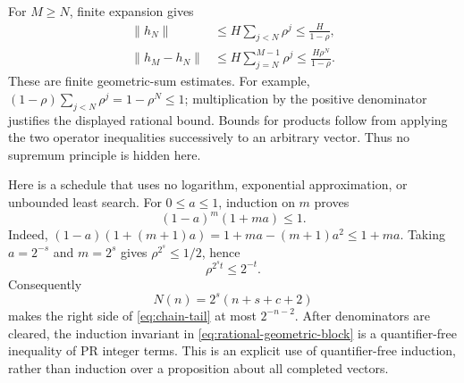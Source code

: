 For $M\ge N$, finite expansion gives
\begin{align}
 \|h_N\|&\le H\sum_{j<N}\rho^j
                  \le\frac{H}{1-\rho},\label{eq:chain-bound}\\
 \|h_M-h_N\|&\le H\sum_{j=N}^{M-1}\rho^j
                  \le\frac{H\rho^N}{1-\rho}.
                  \label{eq:chain-tail}
\end{align}
These are finite geometric-sum estimates.  For example,
$(1-\rho)\sum_{j<N}\rho^j=1-\rho^N\le1$; multiplication by the
positive denominator justifies the displayed rational bound.  Bounds for
products follow from applying the two operator inequalities successively
to an arbitrary vector.  Thus no supremum principle is hidden here.

Here is a schedule that uses no logarithm, exponential approximation,
or unbounded least search.  For $0\le a\le1$, induction on $m$ proves
\begin{equation}
                   (1-a)^m(1+ma)\le1.
 \label{eq:rational-geometric-block}
\end{equation}
Indeed,
$(1-a)(1+(m+1)a)=1+ma-(m+1)a^2\le1+ma$.
Taking $a=2^{-s}$ and $m=2^s$ gives
$\rho^{2^s}\le1/2$, hence
\[
                         \rho^{2^s t}\le2^{-t}.
\]
Consequently
\begin{equation}
                  N(n)=2^s(n+s+c+2)
                  \label{eq:chain-schedule}
\end{equation}
makes the right side of \eqref{eq:chain-tail} at most $2^{-n-2}$.
After denominators are cleared, the induction invariant in
\eqref{eq:rational-geometric-block} is a quantifier-free inequality of
PR integer terms.  This is an explicit use of quantifier-free induction,
rather than induction over a proposition about all completed vectors.


